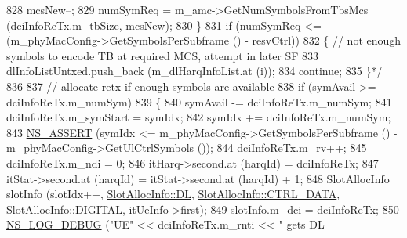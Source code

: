 \begin{DoxyCode}
828 \textcolor{comment}{                                        mcsNew--;}
829 \textcolor{comment}{                                        numSymReq = m\_amc->GetNumSymbolsFromTbsMcs (dciInfoReTx.m\_tbSize,
       mcsNew);}
830 \textcolor{comment}{                                \}}
831 \textcolor{comment}{                                if (numSymReq <= (m\_phyMacConfig->GetSymbolsPerSubframe () - resvCtrl))}
832 \textcolor{comment}{                                \{       // not enough symbols to encode TB at required MCS, attempt in
       later SF}
833 \textcolor{comment}{                                        dlInfoListUntxed.push\_back (m\_dlHarqInfoList.at (i));}
834 \textcolor{comment}{                                        continue;}
835 \textcolor{comment}{                                \}*/}
836 
837                                 \textcolor{comment}{// allocate retx if enough symbols are available}
838                                 \textcolor{keywordflow}{if} (symAvail >= dciInfoReTx.m\_numSym)
839                                 \{
840                                         symAvail -= dciInfoReTx.m\_numSym;
841                                         dciInfoReTx.m\_symStart = symIdx;
842                                         symIdx += dciInfoReTx.m\_numSym;
843                                         \hyperlink{assert_8h_a6dccdb0de9b252f60088ce281c49d052}{NS\_ASSERT} (symIdx <= m\_phyMacConfig->GetSymbolsPerSubframe
       () - \hyperlink{classns3_1_1MmWaveMacScheduler_a24d7af4971d2e500fe543cefbafa2fd9}{m\_phyMacConfig}->\hyperlink{classns3_1_1MmWavePhyMacCommon_aa0bf8af14050bc5dc6513fbc86319a9b}{GetUlCtrlSymbols} ());
844                                         dciInfoReTx.m\_rv++;
845                                         dciInfoReTx.m\_ndi = 0;
846                                         itHarq->second.at (harqId) = dciInfoReTx;
847                                         itStat->second.at (harqId) = itStat->second.at (harqId) + 1;
848                                         SlotAllocInfo slotInfo (slotIdx++, 
      \hyperlink{structns3_1_1SlotAllocInfo_a6cad60db1d39034f1851e2cea625fe5da9a365c9c56b7c32dcae38ee1a468ce6d}{SlotAllocInfo::DL}, \hyperlink{structns3_1_1SlotAllocInfo_a3ea7cb503bfd0c9a4df55a71b81b9331a1ea636c3f068558fabacbc39934309b8}{SlotAllocInfo::CTRL\_DATA}, 
      \hyperlink{structns3_1_1SlotAllocInfo_adcbd067d82be6260b3399167d8f0b4eca47a67c342db658a08ded9ce4b49417ea}{SlotAllocInfo::DIGITAL}, itUeInfo->first);
849                                         slotInfo.m\_dci = dciInfoReTx;
850                                         \hyperlink{group__logging_ga413f1886406d49f59a6a0a89b77b4d0a}{NS\_LOG\_DEBUG} (\textcolor{stringliteral}{"UE"} << dciInfoReTx.m\_rnti << \textcolor{stringliteral}{" gets DL
}
\end{DoxyCode}
